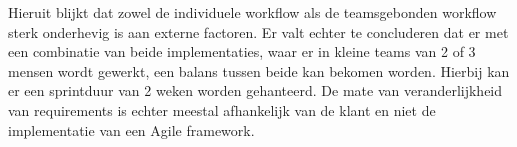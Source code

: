     Hieruit blijkt dat zowel de individuele workflow als de teamsgebonden workflow sterk onderhevig is aan externe factoren. Er valt echter te concluderen dat er met een combinatie van beide implementaties, waar er in kleine teams van 2 of 3 mensen wordt gewerkt, een balans tussen beide kan bekomen worden. Hierbij kan er een sprintduur van 2 weken worden gehanteerd. De mate van veranderlijkheid van requirements is echter meestal afhankelijk van de klant en niet de implementatie van een Agile framework.
